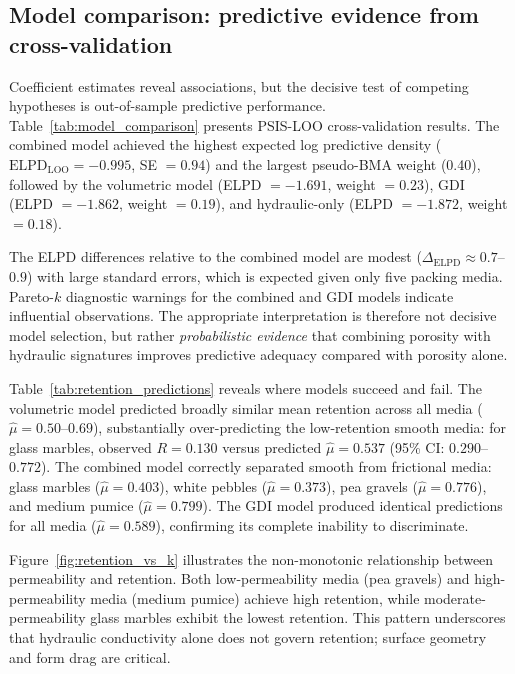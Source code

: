 \documentclass[12pt,a4paper]{article}
\begin{document}
\subsection{Model comparison: predictive evidence from cross-validation}

Coefficient estimates reveal associations, but the decisive test of competing hypotheses is out-of-sample predictive performance. Table~\ref{tab:model_comparison} presents PSIS-LOO cross-validation results. The combined model achieved the highest expected log predictive density ($\mathrm{ELPD}_{\mathrm{LOO}} = -0.995$, SE $= 0.94$) and the largest pseudo-BMA weight (0.40), followed by the volumetric model (ELPD $= -1.691$, weight $= 0.23$), GDI (ELPD $= -1.862$, weight $= 0.19$), and hydraulic-only (ELPD $= -1.872$, weight $= 0.18$).

The ELPD differences relative to the combined model are modest ($\Delta_{\mathrm{ELPD}} \approx 0.7$--$0.9$) with large standard errors, which is expected given only five packing media. Pareto-$k$ diagnostic warnings for the combined and GDI models indicate influential observations. The appropriate interpretation is therefore not decisive model selection, but rather \emph{probabilistic evidence} that combining porosity with hydraulic signatures improves predictive adequacy compared with porosity alone.



Table~\ref{tab:retention_predictions} reveals where models succeed and fail. The volumetric model predicted broadly similar mean retention across all media ($\hat{\mu} = 0.50$--$0.69$), substantially over-predicting the low-retention smooth media: for glass marbles, observed $R = 0.130$ versus predicted $\hat{\mu} = 0.537$ (95\% CI: $0.290$--$0.772$). The combined model correctly separated smooth from frictional media: glass marbles ($\hat{\mu} = 0.403$), white pebbles ($\hat{\mu} = 0.373$), pea gravels ($\hat{\mu} = 0.776$), and medium pumice ($\hat{\mu} = 0.799$). The GDI model produced identical predictions for all media ($\hat{\mu} = 0.589$), confirming its complete inability to discriminate.



Figure~\ref{fig:retention_vs_k} illustrates the non-monotonic relationship between permeability and retention. Both low-permeability media (pea gravels) and high-permeability media (medium pumice) achieve high retention, while moderate-permeability glass marbles exhibit the lowest retention. This pattern underscores that hydraulic conductivity alone does not govern retention; surface geometry and form drag are critical.
\end{document}
